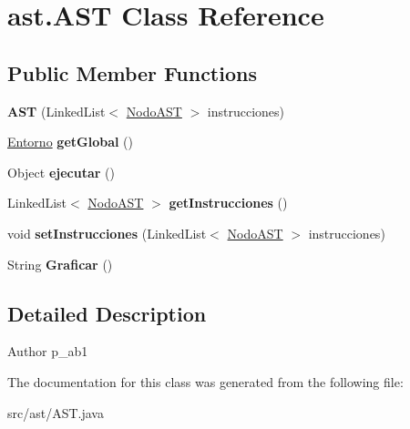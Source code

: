 \hypertarget{classast_1_1_a_s_t}{}\section{ast.\+A\+ST Class Reference}
\label{classast_1_1_a_s_t}
\subsection*{Public Member Functions}
\begin{DoxyCompactItemize}
\item 
\mbox{\label{classast_1_1_a_s_t_a0170adf3b33b82d6a8669a9ff0b74ab9}} 
{\bfseries A\+ST} (Linked\+List$<$ \mbox{\hyperlink{interfaceast_1_1_nodo_a_s_t}{Nodo\+A\+ST}} $>$ instrucciones)
\item 
\mbox{\label{classast_1_1_a_s_t_a6d567e4ad579c30a2911066522ce0e7e}} 
\mbox{\hyperlink{classentorno_1_1_entorno}{Entorno}} {\bfseries get\+Global} ()
\item 
\mbox{\label{classast_1_1_a_s_t_acbb06051ecbb65aa19e941a1ef6ed529}} 
Object {\bfseries ejecutar} ()
\item 
\mbox{\label{classast_1_1_a_s_t_a195d73819c3a51a5f22a4f98f112a9f4}} 
Linked\+List$<$ \mbox{\hyperlink{interfaceast_1_1_nodo_a_s_t}{Nodo\+A\+ST}} $>$ {\bfseries get\+Instrucciones} ()
\item 
\mbox{\label{classast_1_1_a_s_t_a769b18dc96965567424b4cd557166ba9}} 
void {\bfseries set\+Instrucciones} (Linked\+List$<$ \mbox{\hyperlink{interfaceast_1_1_nodo_a_s_t}{Nodo\+A\+ST}} $>$ instrucciones)
\item 
\mbox{\label{classast_1_1_a_s_t_a7f988b92f6b374530103eb57584ede90}} 
String {\bfseries Graficar} ()
\end{DoxyCompactItemize}


\subsection{Detailed Description}
\begin{DoxyAuthor}{Author}
p\+\_\+ab1 
\end{DoxyAuthor}


The documentation for this class was generated from the following file\+:\begin{DoxyCompactItemize}
\item 
src/ast/A\+S\+T.\+java\end{DoxyCompactItemize}
